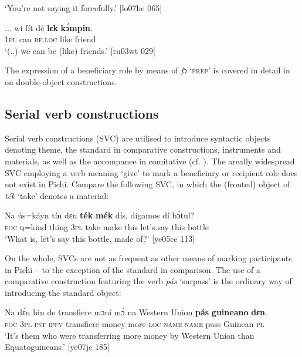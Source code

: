 \glt ‘You’re not saying it forcefully.’ [lo07he 065]
\z


\ea%
    \label{ex:key:1076}
    \gll \op...\cp{}  wi  fít  dé    \textbf{lɛk}  \textbf{kɔ́mpin}.\\
    {} \textsc{1pl}  can  \textsc{be.loc}  like  friend\\

\glt ‘(..) we can be (like) friends.’ [ru03wt 029]
\z

The expression of a beneficiary role by means of \textit{fɔ} ‘\textsc{prep}’ is covered in detail in  on double-object constructions. 

\subsection{Serial verb constructions}\label{sec:9.1.4}

Serial verb constructions (SVC) are utilised to introduce syntactic objects denoting theme, the standard in comparative constructions, instrument\is{}s and materials, as well as the accompanee in comitative (cf. \textsc{).} The areally widespread SVC employing a verb meaning ‘give’ to mark a beneficiary or recipient role does not exist in Pichi. Compare the following SVC, in which the (fronted) object of \textit{ték} ‘take’ denotes a material: 


\ea%
    \label{ex:key:1077}
    \gll Na  ús=káyn  tín    dɛn  \textbf{ték}    \textbf{mék}    dís,  digamos  dí  bɔ́tul?\\
\textsc{foc}  \textsc{q}=kind  thing  \textsc{3pl}  take    make  this  let’s.say  this  bottle\\

\glt ‘What is, let’s say this bottle, made of?’ [ye05ce 113]
\z

On the whole, SVCs are not as frequent as other means of marking participants in Pichi – to the exception of the standard in comparison. The use of a comparative construction featuring the verb \textit{pás} ‘surpass’ is the ordinary way of introducing the standard object:


\ea%
    \label{ex:key:1078}
    \gll Na  dɛ́n  bin  de  transfiere  mɔní  mɔ́    na  Western  Union
\textbf{pás}  \textbf{guineano}  \textbf{dɛn}.\\
\textsc{foc}  \textsc{3pl}  \textsc{pst}  \textsc{ipfv}  transfiere  money  more  \textsc{loc}  \textsc{name}  \textsc{name}
pass  Guinean    \textsc{pl}\\
\glt ‘It’s them who were transferring more money by Western Union
than Equatoguineans.’ [ye07je 185]
\z

